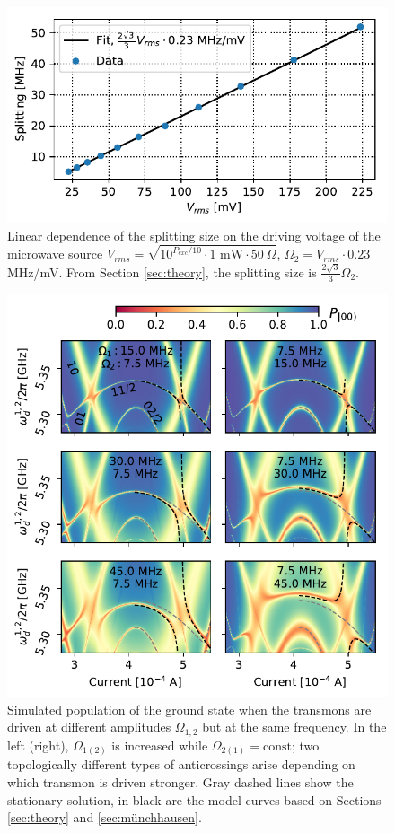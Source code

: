 \documentclass[%
 aip,
 amsmath,amssymb,
 reprint,%
]{revtex4-1}
\begin{document}
\begin{figure}
	\includegraphics[width=\linewidth]{powerscan_1d}
	\caption{Linear dependence of the splitting size on the driving voltage of the microwave source $V_{rms} = \sqrt{10^{P_{exc}/10}\cdot 1 \text{ mW} \cdot 50\ \Omega}$, $\Omega_2 = V_{rms}\cdot 0.23$ MHz/mV. From Section \ref{sec:theory}, the splitting size is $\frac{2\sqrt{3}}{3} \Omega_2$.}
	\label{fig:splitting_linear}
\end{figure}

\begin{figure}
	\centering
	\includegraphics[width=\linewidth]{topological_splittings}
	\caption{Simulated population of the ground state when the transmons are driven at different amplitudes $\Omega_{1,2}$ but at the same frequency. In the left (right), $\Omega_{1(2)}$ is increased while $\Omega_{2(1)} = \text{const}$; two topologically different types of anticrossings arise depending on which transmon is driven stronger. Gray dashed lines show the stationary solution, in black are the model curves based on Sections \ref{sec:theory} and \ref{sec:münchhausen}.}
	\label{fig:difdrive}
\end{figure}
\end{document}
